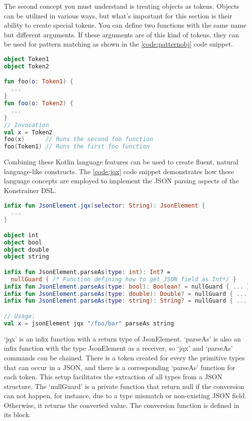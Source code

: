 The second concept you must understand is treating objects as tokens. Objects can be utilized in various ways, but what's important for this section is their ability to create special tokens. You can define two functions with the same name but different arguments. If these arguments are of this kind of tokens, they can be used for pattern matching as shown in the \ref{code:patternobj} code snippet.

\begin{lstlisting}[caption={Pattern matching},language=Kotlin,label=code:patternobj]
object Token1
object Token2

fun foo(o: Token1) {
  ...
}
fun foo(o: Token2) {
  ...
}
// Invocation
val x = Token2
foo(x)      // Runs the second foo function
foo(Token1) // Runs the first foo function
\end{lstlisting}

Combining these Kotlin language features can be used to create fluent, natural language-like constructs. The \ref{code:jqx} code snippet demonstrates how these language concepts are employed to implement the JSON parsing aspects of the Konstrainer DSL.

\begin{lstlisting}[caption={jqx implementation},language=Kotlin,label=code:jqx]
infix fun JsonElement.jqx(selector: String): JsonElement {
  ...
}

object int
object bool
object double
object string

infix fun JsonElement.parseAs(type: int): Int? = 
  nullGuard { /* Function defining how to get JSON field as Int*/ }
infix fun JsonElement.parseAs(type: bool): Boolean? = nullGuard { ... }
infix fun JsonElement.parseAs(type: double): Double? = nullGuard { ... }
infix fun JsonElement.parseAs(type: string): String? = nullGuard { ... }

// Usage:
val x = jsonElement jqx "/foo/bar" parseAs string
\end{lstlisting}

`jqx' is an infix function with a return type of JsonElement. `parseAs' is also an infix function with the type JsonElement as a receiver, so `jqx' and `parseAs' commands can be chained. There is a token created for every the primitive types that can occur in a JSON, and there is a corresponding `parseAs' function for each token. This setup facilitates the extraction of all types from a JSON structure. The `nullGuard' is a private function that return null if the conversion can not happen, for instance, due to a type mismatch or non-existing JSON field. Otherwise, it returns the converted value. The conversion function is defined in its block.
